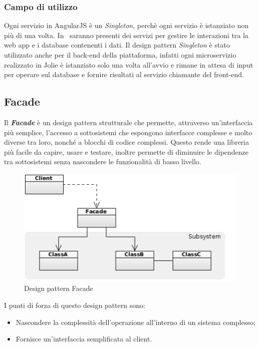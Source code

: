 \subsubsection{Campo di utilizzo}
Ogni servizio in AngularJS è un \textit{Singleton}, perchè ogni servizio è istanziato non più di una volta. In \progetto\ saranno presenti dei servizi per gestire le interazioni tra la web app e i database contenenti i dati.
Il design pattern \textit{Singleton} è stato utilizzato anche per il back-end della piattaforma, infatti ogni microservizio realizzato in Jolie è istanziato solo una volta all'avvio e rimane in attesa di input per operare sul database e fornire risultati al servizio chiamante del front-end. 


\subsection{Facade}
Il \textbf{\textit{Facade}} è un design pattern strutturale che permette, attraverso un'interfaccia più semplice, l'accesso a sottosistemi che espongono interfacce complesse e molto diverse tra loro, nonché a blocchi di codice complessi.
Questo rende una libreria più facile da capire, usare e testare, inoltre permette di diminuire le dipendenze tra sottosistemi senza nascondere le funzionalità di basso livello.

\begin{figure}[H]
	\centering
	\includegraphics[width=0.7\linewidth]{IMG/facade_pattern.png}
	\caption{Design pattern Facade}
\end{figure}

I punti di forza di questo design pattern sono:
\begin{itemize}
	\item Nascondere la complessità dell'operazione all'interno di un sistema complesso;
	
	\item Fornisce un'interfaccia semplificata al client.
\end{itemize}

